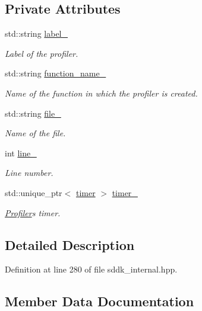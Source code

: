 \subsection*{Private Attributes}
\begin{DoxyCompactItemize}
\item 
std\+::string \hyperlink{classsddk_1_1_profiler_a0002ab96e7c57f2681b24aaa699c1780}{label\+\_\+}
\begin{DoxyCompactList}\small\item\em Label of the profiler. \end{DoxyCompactList}\item 
std\+::string \hyperlink{classsddk_1_1_profiler_a7c9d9cd04df09edb557a10d77d10cd50}{function\+\_\+name\+\_\+}
\begin{DoxyCompactList}\small\item\em Name of the function in which the profiler is created. \end{DoxyCompactList}\item 
std\+::string \hyperlink{classsddk_1_1_profiler_a9c326d39981f3ed63f58a0329c408b2e}{file\+\_\+}
\begin{DoxyCompactList}\small\item\em Name of the file. \end{DoxyCompactList}\item 
int \hyperlink{classsddk_1_1_profiler_a9a3f56b94bb94e03aa901d2d272e21fa}{line\+\_\+}
\begin{DoxyCompactList}\small\item\em Line number. \end{DoxyCompactList}\item 
std\+::unique\+\_\+ptr$<$ \hyperlink{classsddk_1_1timer}{timer} $>$ \hyperlink{classsddk_1_1_profiler_a08fe0cc2c8a01af25c32303f7fe76208}{timer\+\_\+}
\begin{DoxyCompactList}\small\item\em \hyperlink{classsddk_1_1_profiler}{Profiler}\textquotesingle{}s timer. \end{DoxyCompactList}\end{DoxyCompactItemize}


\subsection{Detailed Description}


Definition at line 280 of file sddk\+\_\+internal.\+hpp.



\subsection{Member Data Documentation}
\hypertarget{classsddk_1_1_profiler_a0002ab96e7c57f2681b24aaa699c1780}{}
